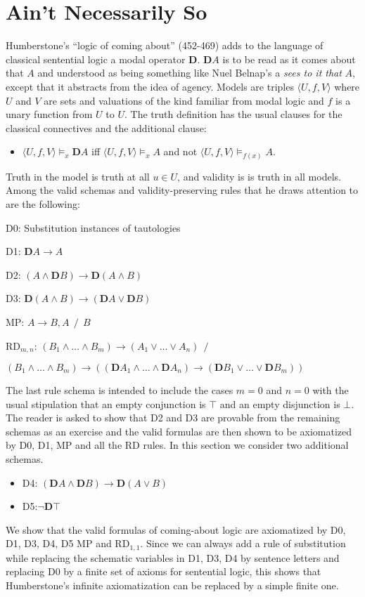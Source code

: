 \section{Ain't Necessarily So}
Humberstone's ``logic of coming about'' (452-469) adds to the language of classical sentential logic a modal operator $\mathbf{D}$. $\mathbf{D}A$ is to be read as it comes about that $A$ and understood as being something like Nuel Belnap's a \textit{sees to it that} $A$, except that it abstracts from the idea of agency. Models are triples $\langle U,f,V\rangle $ where $U$ and $V$ are sets and valuations of the kind familiar from modal logic and $f$ is a unary function from $U$ to $U$. The truth definition has the usual clauses for the classical connectives and the additional clause:
\begin{itemize}[label={}]
\item{ $\langle U,f,V\rangle  \models _x \mathbf{D}A$ iff $\langle U,f,V\!\rangle  \models _x A$ and not $\langle U,f,V\!\rangle \models _{f(x)} A$.}\end{itemize} 
Truth in the model is truth at all $u{\in}U$, and validity is is truth in all models. Among the valid schemas and validity-preserving rules that he draws attention to are the following:
\begin{itemize}[label={}]
\setlength\itemsep{.2 pt}
\item{D0: Substitution instances of tautologies}
\item{D1: $\mathbf{D}A\rightarrow A$}
\item{D2: $(A\wedge\mathbf{D}B) \rightarrow \mathbf{D}(A\wedge B)$}
\item{D3: $\mathbf{D}(A\wedge B) \rightarrow (\mathbf{D}A\vee \mathbf{D}B)$}
\item{MP: $A\rightarrow B, A ~~/~~ B$}
\item{RD$_{m,n}$: $(B_1 \wedge {\ldots}\wedge B_m) \rightarrow (A_1\vee {\ldots}\vee A_n) ~~/ $
\item \tab$ (B_1 \wedge {\ldots}\wedge B_m) \rightarrow ((\mathbf{D}A_1\wedge {\ldots}\wedge \mathbf{D}A_n) \rightarrow (\mathbf{D}B_1 \vee {\ldots}\vee \mathbf{D}B_m))$}
\end{itemize}
The last rule schema is intended to include the cases $m=0$ and $n=0$ with the usual stipulation that an empty conjunction is $\top $ and an empty disjunction is $\bot$. The reader is asked to show that D2 and D3 are provable from the remaining schemas as an exercise and the valid formulas are then shown to be axiomatized by D0, D1, MP and all the RD rules. In this section we consider two additional schemas.
\begin{itemize}[label={}]
\item{D4: $(\mathbf{D}A\wedge \mathbf{D}B) \rightarrow \mathbf{D}(A\vee B)$}
\item{D5:$\neg \mathbf{D}\top $}
\end{itemize}
We show that the valid formulas of coming-about logic are axiomatized by D0, D1, D3, D4, D5 MP and RD$_{1,1}$. Since we can always add a rule of substitution while replacing the schematic variables in D1, D3, D4 by sentence letters and replacing D0 by a finite set of axioms for sentential logic, this shows that Humberstone's infinite axiomatization can be replaced by a simple finite one. 


